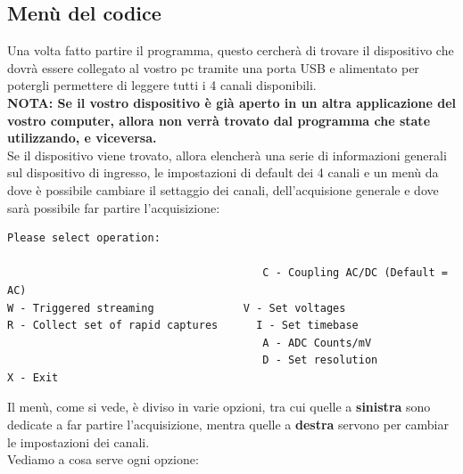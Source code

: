 \documentclass[a4paper]{article}
\begin{document}
\subsection{Menù del codice}
Una volta fatto partire il programma, questo cercherà di trovare il dispositivo che dovrà essere collegato al vostro pc tramite una porta USB e alimentato per potergli permettere di leggere tutti i 4 canali disponibili.\\
\noindent \textbf{NOTA: Se il vostro dispositivo è già aperto in un altra applicazione del vostro computer, allora non verrà trovato dal programma che state utilizzando, e viceversa.}\\
\noindent Se il dispositivo viene trovato, allora elencherà una serie di informazioni generali sul dispositivo di ingresso, le impostazioni di default dei 4 canali e un menù da dove è possibile cambiare il settaggio dei canali, dell'acquisione generale e dove sarà possibile far partire l'acquisizione:
\begin{tcolorbox}
\begin{Verbatim}[tabsize = 4]
Please select operation:

										C - Coupling AC/DC (Default = AC)
W - Triggered streaming				 V - Set voltages
R - Collect set of rapid captures	   I - Set timebase 
										A - ADC Counts/mV
										D - Set resolution
X - Exit
\end{Verbatim}
\end{tcolorbox}
\noindent Il menù, come si vede, è diviso in varie opzioni, tra cui quelle a \textbf{sinistra} sono dedicate a far partire l'acquisizione, mentra quelle a \textbf{destra} servono per cambiar le impostazioni dei canali.\\
\noindent Vediamo a cosa serve ogni opzione:
\end{document}
